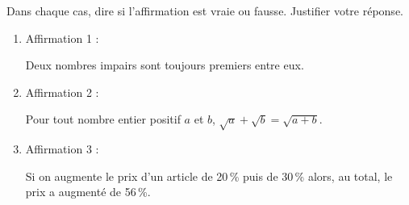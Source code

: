
\medskip

Dans chaque cas, dire si l'affirmation est vraie ou fausse. Justifier votre réponse.

\medskip

\begin{enumerate}
\item Affirmation 1 :

Deux nombres impairs sont toujours premiers entre eux.
\item Affirmation 2 :

Pour tout nombre entier positif $a$ et $b$, $\sqrt{a} + \sqrt{b} = \sqrt{a + b}$.
\item Affirmation 3 :

Si on augmente le prix d'un article de 20\,\% puis de 30\,\% alors, au total, le prix a
augmenté de 56\,\%.
\end{enumerate}

\bigskip

